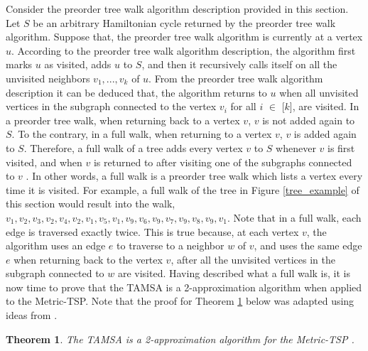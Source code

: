 \documentclass[12pt]{article}
\newtheorem{theorem}[definition]{Theorem}
\numberwithin{equation}{subsection}
\numberwithin{table}{subsection}
\numberwithin{algorithm}{subsection}
\begin{document}
Consider the preorder tree walk algorithm description provided in this section. Let $S$ be an arbitrary Hamiltonian cycle returned by the preorder tree walk algorithm. Suppose that, the preorder tree walk algorithm is currently at a vertex $u$. According to the preorder tree walk algorithm description, the algorithm first marks $u$ as visited, adds $u$ to $S$, and then it recursively calls itself on all the unvisited neighbors $v_1, ..., v_k$ of $u$. From the preorder tree walk algorithm description it can be deduced that, the algorithm returns to $u$ when all unvisited vertices in the subgraph connected to the vertex $v_i$ for all $i$ $\in$ [$k$], are visited. In a preorder tree walk, when returning back to a vertex $v$, $v$ is not added again to $S$. To the contrary, in a full walk, when returning to a vertex $v$, $v$ is added again to $S$. Therefore, a full walk of a tree adds every vertex $v$ to $S$ whenever $v$ is first visited, and when $v$ is returned to after visiting one of the subgraphs connected to $v$ \cite{cormen_leiserson_rivest_stein}. In other words, a full walk is a preorder tree walk which lists a vertex every time it is visited. For example, a full walk of the tree in Figure \ref{tree_example} of this section would result into the walk, $v_1, v_2, v_3, v_2, v_4, v_2, v_1, v_5, v_1, v_9, v_6, v_9, v_7, v_9, v_8, v_9, v_1$. Note that in a full walk, each edge is traversed exactly twice. This is true because, at each vertex $v$, the algorithm uses an edge $e$ to traverse to a neighbor $w$ of $v$, and uses the same edge $e$ when returning back to the vertex $v$, after all the unvisited vertices in the subgraph connected to $w$ are visited. Having described what a full walk is, it is now time to prove that the TAMSA is a 2-approximation algorithm when applied to the Metric-TSP. Note that the proof for Theorem \ref{2_approx} below was adapted using ideas from \cite{cormen_leiserson_rivest_stein}.
\begin{theorem}
\label{2_approx}
The TAMSA is a 2-approximation algorithm for the Metric-TSP {}.
\end{theorem}
\end{document}
